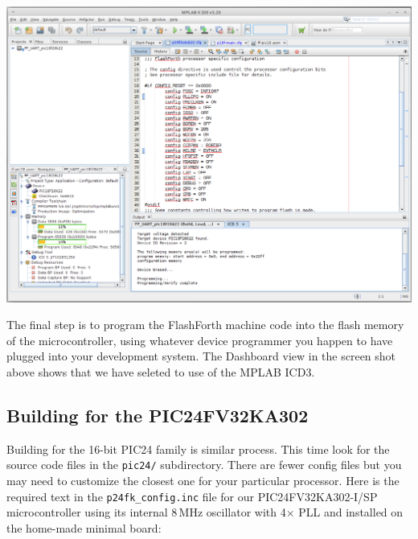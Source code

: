 \documentclass[12pt,a4paper]{article}
\begin{document}
\bigskip
\noindent
\includegraphics[width=\textwidth]{../figs/MPLAB-X-build-of-Flash-Forth-for-PIC18F26K22-2016.png}

\medskip\noindent
The final step is to program the FlashForth machine code into the flash memory of the microcontroller,
using whatever device programmer you happen to have plugged into your development system.
The Dashboard view in the screen shot above shows that we have seleted to use of the MPLAB ICD3.


\medskip
\subsection{Building for the PIC24FV32KA302}
%
Building for the 16-bit PIC24 family is similar process.
This time look for the source code files in the \verb!pic24/! subdirectory.
There are fewer config files but you may need to customize the closest one for 
your particular processor.  
Here is the required text in the \verb!p24fk_config.inc! file 
for our PIC24FV32KA302-I/SP microcontroller using its internal 8\,MHz oscillator
with 4$\times$ PLL
and installed on the home-made minimal board:
\end{document}
